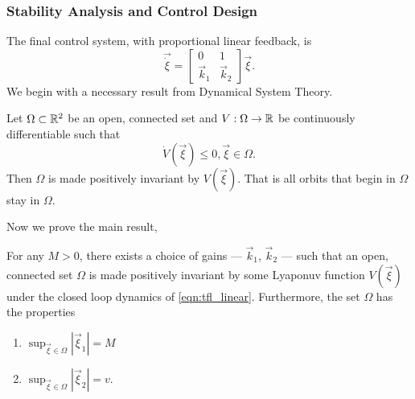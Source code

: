 \subsubsection{Stability Analysis and Control Design}\label{sec:sf_stability_analysis}
The final control system, with proportional linear feedback, is
\begin{equation}
    \vec{\dot{\xi}} =   \begin{bmatrix}
                            0 & 1 \\
                            \vec{k}_1 & \vec{k}_2
                        \end{bmatrix}
                        \vec{\xi}.
    \label{eqn:tfl_linear}
\end{equation}
We begin with a necessary result from Dynamical System Theory.
\begin{theorem}
    Let $\Omega\subset\mathbb{R}^2$ be an open, connected set and $V:\Omega\to\mathbb{R}$ be continuously differentiable such that $$ \dot{V}(\vec{\xi})\leq 0, \vec{\xi}\in\Omega.$$ Then $\Omega$ is made positively invariant by $V(\vec{\xi})$. That is all orbits that begin in $\Omega$ stay in $\Omega$.
    \label{thm:lasalle}
\end{theorem}
Now we prove the main result,
\begin{theorem}
    For any $M>0$, there exists a choice of gains --- $\vec{k}_1$, $\vec{k}_2$ --- such that an open, connected set $\Omega$ is made positively invariant by some Lyaponuv function $V(\vec{\xi})$ under the closed loop dynamics of \eqref{eqn:tfl_linear}. Furthermore, the set $\Omega$ has the properties
    \begin{enumerate}
        \item $\sup_{\vec{\xi}\in\Omega}{\left|\vec{\xi}_1\right|} = M$
        \item $\sup_{\vec{\xi}\in\Omega}{\left|\vec{\xi}_2\right|} = v$.
    \end{enumerate}
    \label{thm:sf_stability}
\end{theorem}

